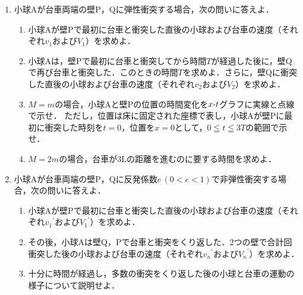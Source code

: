\begin{enumerate}[（1）]
  \setlength{\leftskip}{-1.5zw}
  \setlength{\itemindent}{1zw}\setlength{\labelsep}{0.5zw}
  \setlength{\labelwidth}{1zw}\setlength{\leftmargin}{1zw}
  \setlength{\itemsep}{0.5\baselineskip}
  \item 小球Aが台車両端の壁P，Qに弾性衝突する場合，次の問いに答えよ．
  \begin{enumerate}[（a）]
    \setlength{\leftskip}{-2.5zw}
    \setlength{\itemindent}{1zw}\setlength{\labelsep}{1zw}
    \setlength{\labelwidth}{1zw}
    \item 小球Aが壁Pで最初に台車と衝突した直後の小球および台車の速度（それぞれ$v_1$および$V_1$）を求めよ．
    \item 小球Aは，壁Pで最初に台車と衝突してから時間$T$が経過した後に，壁Qで再び台車と衝突した．このときの時間$T$を求めよ．さらに，壁Qに衝突した直後の小球および台車の速度（それぞれ$v_2$および$V_2$）を求めよ．
    \item $M=m$の場合，小球Aと壁Pの位置の時間変化を$x\mathchar`-t$グラフに実線と点線で示せ．
    ただし，位置は床に固定された座標\x で表し，小球Aが壁Pに最初に衝突した時刻を$t=0$，位置を$x=0$として，$0\leqq t\leqq 3T$の範囲で示せ．
    \item $M=2m$の場合，台車が3Lの距離を進むのに要する時間を求めよ．
  \end{enumerate}
  \item 小球Aが台車両端の壁P，Qに反発係数$e\,(0<e<1)$で非弾性衝突する場合，次の問いに答えよ．
  \begin{enumerate}[（a）]
    \setlength{\leftskip}{-2.5zw}
    \setlength{\itemindent}{1zw}\setlength{\labelsep}{1zw}
    \setlength{\labelwidth}{1zw}
    \item 小球Aが壁Pで最初に台車と衝突した直後の小球および台車の速度（それぞれ${v_1}^\prime$および${V_1}^\prime$）を求めよ．
    \item その後，小球Aは壁Q，Pで台車と衝突をくり返した．2つの壁で合計\nn 回衝突した後の小球および台車の速度（それぞれ${v_n}^\prime$および${V_n}^\prime$）を求めよ．
    \item 十分に時間が経過し，多数の衝突をくり返した後の小球と台車の運動の様子について説明せよ．
  \end{enumerate}
\end{enumerate}

